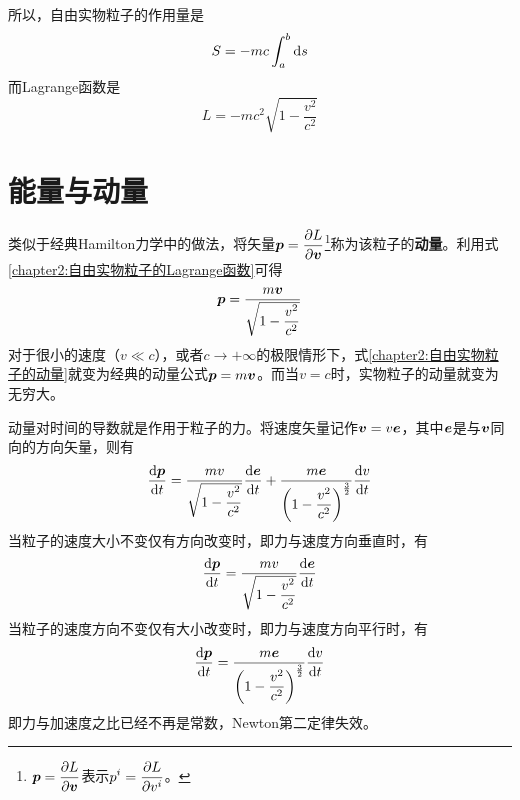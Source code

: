 所以，自由实物粒子的作用量是
\begin{equation}
	S = -mc\int_a^b \mathrm{d} s
	\label{chapter2:自由实物粒子的作用量}
\end{equation}
而Lagrange函数是
\begin{equation}
	L = -mc^2\sqrt{1-\dfrac{v^2}{c^2}}
	\label{chapter2:自由实物粒子的Lagrange函数}
\end{equation}

\section{能量与动量}

类似于经典Hamilton力学中的做法，将矢量$\boldsymbol{p} = \dfrac{\partial L}{\partial \boldsymbol{v}}$\footnote{$\boldsymbol{p} = \dfrac{\partial L}{\partial \boldsymbol{v}}$表示$\displaystyle p^i = \frac{\partial L}{\partial v^i}$。}称为该粒子的{\bf 动量}。利用式\eqref{chapter2:自由实物粒子的Lagrange函数}可得
\begin{equation}
	\boldsymbol{p} = \frac{m\boldsymbol{v}}{\sqrt{1-\dfrac{v^2}{c^2}}}
	\label{chapter2:自由实物粒子的动量}
\end{equation}
对于很小的速度（$v\ll c$），或者$c\to +\infty$的极限情形下，式\eqref{chapter2:自由实物粒子的动量}就变为经典的动量公式$\boldsymbol{p} = m\boldsymbol{v}$。而当$v=c$时，实物粒子的动量就变为无穷大。

动量对时间的导数就是作用于粒子的力。将速度矢量记作$\boldsymbol{v}=v\boldsymbol{e}$，其中$\boldsymbol{e}$是与$\boldsymbol{v}$同向的方向矢量，则有
\begin{equation}
	\frac{\mathrm{d} \boldsymbol{p}}{\mathrm{d} t} = \frac{mv}{\sqrt{1-\dfrac{v^2}{c^2}}} \frac{\mathrm{d} \boldsymbol{e}}{\mathrm{d} t} + \frac{m\boldsymbol{e}}{\left(1-\dfrac{v^2}{c^2}\right)^{\frac32}} \frac{\mathrm{d} v}{\mathrm{d} t}
\end{equation}
当粒子的速度大小不变仅有方向改变时，即力与速度方向垂直时，有
\begin{equation*}
	\frac{\mathrm{d} \boldsymbol{p}}{\mathrm{d} t} = \frac{mv}{\sqrt{1-\dfrac{v^2}{c^2}}} \frac{\mathrm{d} \boldsymbol{e}}{\mathrm{d} t}
\end{equation*}
当粒子的速度方向不变仅有大小改变时，即力与速度方向平行时，有
\begin{equation*}
	\frac{\mathrm{d} \boldsymbol{p}}{\mathrm{d} t} = \frac{m\boldsymbol{e}}{\left(1-\dfrac{v^2}{c^2}\right)^{\frac32}} \frac{\mathrm{d} v}{\mathrm{d} t}
\end{equation*}
即力与加速度之比已经不再是常数，Newton第二定律失效。

